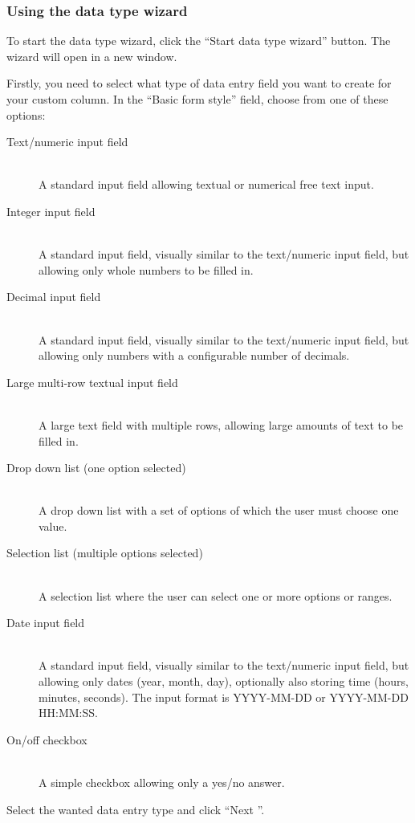 \subsubsection{Using the data type wizard}
To start the data type wizard, click the ``Start data type wizard'' button.
The wizard will open in a new window.

Firstly, you need to select what type of data entry field you want to create for your custom column.
In the ``Basic form style'' field, choose from one of these options:
\begin{description}
  \item[Text/numeric input field] \hfill \\
  A standard input field allowing textual or numerical free text input.
  \item[Integer input field] \hfill \\
  A standard input field, visually similar to the text/numeric input field, but allowing only whole numbers to be filled in.
  \item[Decimal input field] \hfill \\
  A standard input field, visually similar to the text/numeric input field, but allowing only numbers with a configurable number of decimals.
  \item[Large multi-row textual input field] \hfill \\
  A large text field with multiple rows, allowing large amounts of text to be filled in.
  \item[Drop down list (one option selected)] \hfill \\
  A drop down list with a set of options of which the user must choose one value.
  \item[Selection list (multiple options selected)] \hfill \\
  A selection list where the user can select one or more options or ranges.
  \item[Date input field] \hfill \\
  A standard input field, visually similar to the text/numeric input field, but allowing only dates (year, month, day), optionally also storing time (hours, minutes, seconds).
  The input format is YYYY-MM-DD or YYYY-MM-DD HH:MM:SS.
  \item[On/off checkbox] \hfill \\
  A simple checkbox allowing only a yes/no answer.
\end{description}

\noindent
Select the wanted data entry type and click ``Next \guillemotright''.

